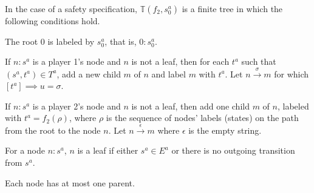 \documentclass[letterpaper, 10 pt, conference]{ieeeconf}
\begin{document}
In the case of a safety specification, $\mathbb{T}(f_2, s^a_0 )$ is a
finite tree in which the following conditions hold. 
\begin{inparaenum}[1)]
\item The root $0$ is labeled by $s^a_0$, that is, $0: s^a_0$.
\item If $n:s^a$ is a player 1's node and $n$ is not a leaf, then for
  each $t^a $ such that $(s^a,t^a)\in T^a$, add a new child $m$ of $n$
  and label $m$ with $t^a$. Let $n \xrightarrow{\sigma} m$ for which
  $[t^a] \implies u=\sigma $.
\item If $n: s^a$ is a player 2's node and $n $ is not a leaf, then
  add one child $m$ of $n$, labeled with $t^a= f_2(\rho)$, where
  $\rho$ is the sequence of nodes' labels (states) on the path from
  the root to the node $n$. Let $n \xrightarrow{\epsilon}m$ where
  $\epsilon$ is the empty string. \item For a node $n:s^a$, $n$ is a leaf if either $s^a\in E^a$ or there is no outgoing transition from $s^a$.
\item Each node has at most one parent.
\end{inparaenum} 
\end{document}
